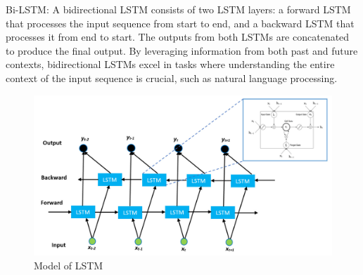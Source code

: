 \documentclass{ieeeojies}
\begin{document}
Bi-LSTM: A bidirectional LSTM consists of two LSTM layers: a forward LSTM that processes the input sequence from start to end, and a backward LSTM that processes it from end to start. The outputs from both LSTMs are concatenated to produce the final output. By leveraging information from both past and future contexts, bidirectional LSTMs excel in tasks where understanding the entire context of the input sequence is crucial, such as natural language processing.
\begin{figure}[H]
  \centering
  \begin{minipage}{0.8\linewidth}
    \centering
    \includegraphics[width=\linewidth]{bibliography/bi-lstm_fig.png}
    \caption{Model of LSTM}
    \label{fig9}
  \end{minipage}
\end{figure}
\end{document}
